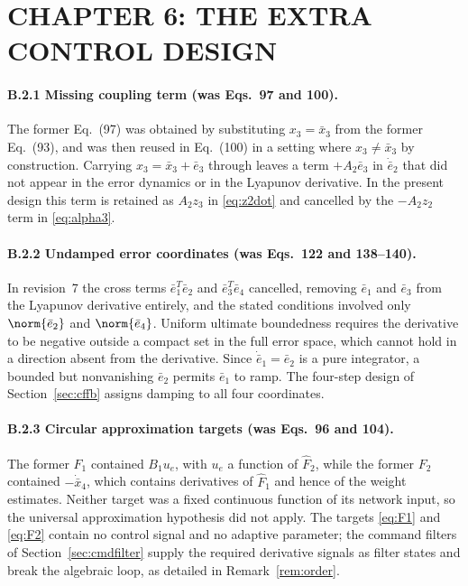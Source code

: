 \section{CHAPTER 6: THE EXTRA CONTROL DESIGN}

\paragraph{B.2.1 Missing coupling term (was Eqs.~97 and 100).}
The former Eq.~(97) was obtained by substituting $x_3=\bar x_3$ from the former
Eq.~(93), and was then reused in Eq.~(100) in a setting where $x_3\ne\bar x_3$
by construction. Carrying $x_3=\bar x_3+\bar e_3$ through leaves a term
$+A_2\bar e_3$ in $\dot{\bar e}_2$ that did not appear in the error dynamics or
in the Lyapunov derivative. In the present design this term is retained as
$A_2z_3$ in \eqref{eq:z2dot} and cancelled by the $-A_2z_2$ term in
\eqref{eq:alpha3}.

\paragraph{B.2.2 Undamped error coordinates (was Eqs.~122 and 138--140).}
In revision~7 the cross terms $\bar e_1^T\bar e_2$ and $\bar e_3^T\bar e_4$
cancelled, removing $\bar e_1$ and $\bar e_3$ from the Lyapunov derivative
entirely, and the stated conditions involved only $\norm{\bar e_2}$ and
$\norm{\bar e_4}$. Uniform ultimate boundedness requires the derivative to be
negative outside a compact set in the full error space, which cannot hold in a
direction absent from the derivative. Since $\dot{\bar e}_1=\bar e_2$ is a pure
integrator, a bounded but nonvanishing $\bar e_2$ permits $\bar e_1$ to ramp.
The four-step design of Section~\ref{sec:cffb} assigns damping to all four
coordinates.

\paragraph{B.2.3 Circular approximation targets (was Eqs.~96 and 104).}
The former $F_1$ contained $B_1u_e$, with $u_e$ a function of $\hat F_2$, while
the former $F_2$ contained $-\dot{\bar x}_4$, which contains derivatives of
$\hat F_1$ and hence of the weight estimates. Neither target was a fixed
continuous function of its network input, so the universal approximation
hypothesis did not apply. The targets \eqref{eq:F1} and \eqref{eq:F2} contain no
control signal and no adaptive parameter; the command filters of
Section~\ref{sec:cmdfilter} supply the required derivative signals as filter
states and break the algebraic loop, as detailed in Remark~\ref{rem:order}.

